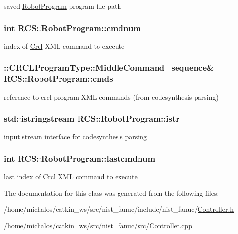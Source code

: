 saved \hyperlink{classRCS_1_1RobotProgram}{Robot\-Program} program file path \hypertarget{classRCS_1_1RobotProgram_ad43243236b573d0e3fc39d4890a43373}{
\subsubsection[{cmdnum}]{\setlength{\rightskip}{0pt plus 5cm}int R\-C\-S\-::\-Robot\-Program\-::cmdnum}}\label{classRCS_1_1RobotProgram_ad43243236b573d0e3fc39d4890a43373}
index of \hyperlink{namespaceCrcl}{Crcl} X\-M\-L command to execute \hypertarget{classRCS_1_1RobotProgram_ad6ed8ea72249e836521b2f7d7feb3523}{
\subsubsection[{cmds}]{\setlength{\rightskip}{0pt plus 5cm}\-::C\-R\-C\-L\-Program\-Type\-::\-Middle\-Command\-\_\-sequence\& R\-C\-S\-::\-Robot\-Program\-::cmds}}\label{classRCS_1_1RobotProgram_ad6ed8ea72249e836521b2f7d7feb3523}
reference to crcl program X\-M\-L commands (from codesynthesis parsing) \hypertarget{classRCS_1_1RobotProgram_a0099964c452870619bd0ee7651ffb072}{
\subsubsection[{istr}]{\setlength{\rightskip}{0pt plus 5cm}std\-::istringstream R\-C\-S\-::\-Robot\-Program\-::istr}}\label{classRCS_1_1RobotProgram_a0099964c452870619bd0ee7651ffb072}
input stream interface for codesynthesis parsing \hypertarget{classRCS_1_1RobotProgram_a6c6a9242582933fa673b9d486913514c}{
\subsubsection[{lastcmdnum}]{\setlength{\rightskip}{0pt plus 5cm}int R\-C\-S\-::\-Robot\-Program\-::lastcmdnum}}\label{classRCS_1_1RobotProgram_a6c6a9242582933fa673b9d486913514c}
last index of \hyperlink{namespaceCrcl}{Crcl} X\-M\-L command to execute 

The documentation for this class was generated from the following files\-:\begin{DoxyCompactItemize}
\item 
/home/michalos/catkin\-\_\-ws/src/nist\-\_\-fanuc/include/nist\-\_\-fanuc/\hyperlink{Controller_8h}{Controller.\-h}\item 
/home/michalos/catkin\-\_\-ws/src/nist\-\_\-fanuc/src/\hyperlink{Controller_8cpp}{Controller.\-cpp}\end{DoxyCompactItemize}
